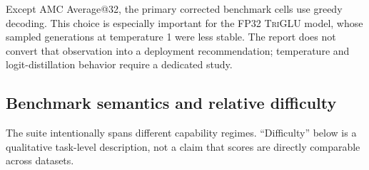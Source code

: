 \documentclass[10pt]{article}
\newcommand{\TriGLU}{\textsc{TriGLU}}
\begin{document}
Except AMC Average@32, the primary corrected benchmark cells use greedy
decoding.  This choice is especially important for the FP32 \TriGLU{} model,
whose sampled generations at temperature 1 were less stable.  The report does
not convert that observation into a deployment recommendation; temperature
and logit-distillation behavior require a dedicated study.

\subsection{Benchmark semantics and relative difficulty}

The suite intentionally spans different capability regimes.  ``Difficulty''
below is a qualitative task-level description, not a claim that scores are
directly comparable across datasets.
\end{document}
